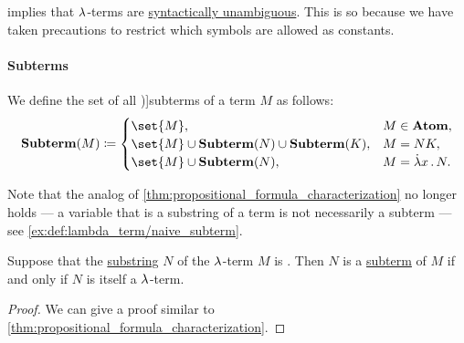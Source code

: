 \begin{remark}\label{rem:binders_and_syntactic_ambiguity}
   implies that \( {\mathrm \lambda} \)-terms are \hyperref[def:grammar_ambiguity]{syntactically unambiguous}. This is so because we have taken precautions to restrict which symbols are allowed as constants.
\end{remark}

\paragraph{Subterms}

\begin{definition}\label{def:lambda_subterm}
  We define the set of all \term[ru=подтерм (\cite[189]{Герасимов2011Вычислимость})]{subterms} of a term \( M \) as follows:
  \begin{equation*}
    \op*{Subterm}(M) \coloneqq \begin{cases}
      \set{ M },                                             &M \in \op*{Atom}, \\
      \set{ M } \cup \op*{Subterm}(N) \cup \op*{Subterm}(K), &M = N K, \\
      \set{ M } \cup \op*{Subterm}(N),                       &M = \qabs x N.
    \end{cases}
  \end{equation*}
\end{definition}
\begin{comments}
  \item Note that the analog of \cref{thm:propositional_formula_characterization} no longer holds --- a variable that is a substring of a term is not necessarily a subterm --- see \cref{ex:def:lambda_term/naive_subterm}.
\end{comments}

\begin{proposition}\label{thm:lambda_subterm_characterization}
  Suppose that the \hyperref[def:formal_language/substring]{substring} \( N \) of the \( {\mathrm \lambda} \)-term \( M \) is . Then \( N \) is a \hyperref[def:lambda_subterm]{subterm} of \( M \) if and only if \( N \) is itself a \( {\mathrm \lambda} \)-term.
\end{proposition}
\begin{proof}
  We can give a proof similar to \cref{thm:propositional_formula_characterization}.
\end{proof}

